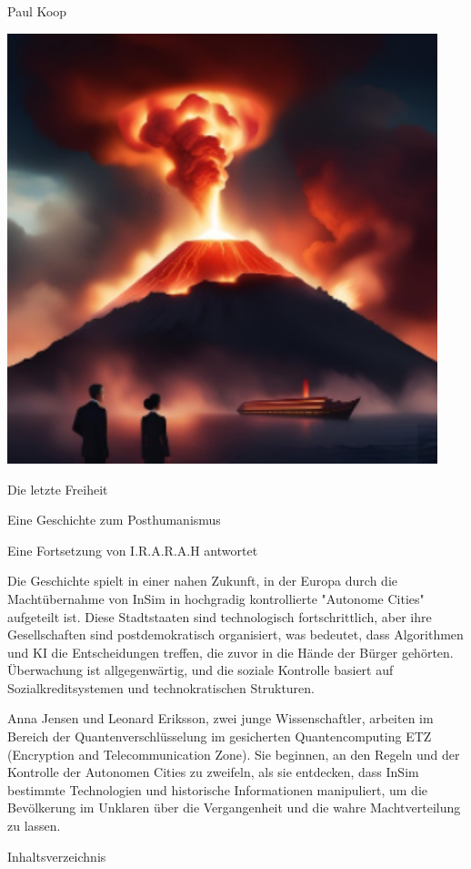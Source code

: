 \documentclass[
]{article}
\author{}
\date{}
\begin{document}
Paul Koop

\includegraphics[width=4.92849in,height=4.92031in]{media/image6.png}

Die letzte Freiheit

Eine Geschichte zum Posthumanismus

Eine Fortsetzung von I.R.A.R.A.H antwortet

Die Geschichte spielt in einer nahen Zukunft, in der Europa durch die
Machtübernahme von InSim in hochgradig kontrollierte "Autonome Cities"
aufgeteilt ist. Diese Stadtstaaten sind technologisch fortschrittlich,
aber ihre Gesellschaften sind postdemokratisch organisiert, was
bedeutet, dass Algorithmen und KI die Entscheidungen treffen, die zuvor
in die Hände der Bürger gehörten. Überwachung ist allgegenwärtig, und
die soziale Kontrolle basiert auf Sozialkreditsystemen und
technokratischen Strukturen.

Anna Jensen und Leonard Eriksson, zwei junge Wissenschaftler, arbeiten
im Bereich der Quantenverschlüsselung im gesicherten Quantencomputing
ETZ (Encryption and Telecommunication Zone). Sie beginnen, an den Regeln
und der Kontrolle der Autonomen Cities zu zweifeln, als sie entdecken,
dass InSim bestimmte Technologien und historische Informationen
manipuliert, um die Bevölkerung im Unklaren über die Vergangenheit und
die wahre Machtverteilung zu lassen.

Inhaltsverzeichnis
\end{document}
